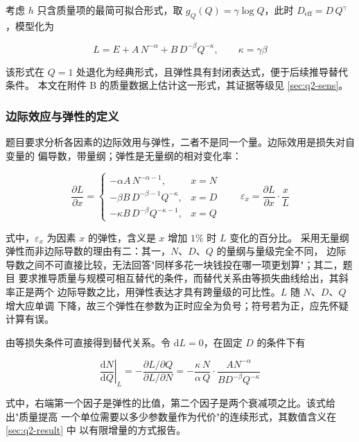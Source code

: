 \documentclass[bwprint]{gmcmthesis}
\numberwithin{equation}{section}
\numberwithin{figure}{section}
\numberwithin{table}{section}
\begin{document}
考虑 $h$ 只含质量项的最简可拟合形式，取 $g_Q(Q)=\gamma\log Q$，此时
$D_{\mathrm{eff}}=D\,Q^{\gamma}$，模型化为

\begin{equation}
L=E+A\,N^{-\alpha}+B\,D^{-\beta}Q^{-\kappa},\qquad \kappa=\gamma\beta
\end{equation}

该形式在 $Q=1$ 处退化为经典形式，且弹性具有封闭表达式，便于后续推导替代条件。
本文在附件 B 的质量数据上估计这一形式，其证据等级见 \ref{sec:q2-sens}。

\subsubsection{边际效应与弹性的定义}

题目要求分析各因素的边际效用与弹性，二者不是同一个量。边际效用是损失对自变量的
偏导数，带量纲；弹性是无量纲的相对变化率：

\begin{equation}
\frac{\partial L}{\partial x}
=\begin{cases}
-\alpha A\,N^{-\alpha-1}, & x=N\\[2pt]
-\beta B\,D^{-\beta-1}Q^{-\kappa}, & x=D\\[2pt]
-\kappa B\,D^{-\beta}Q^{-\kappa-1}, & x=Q
\end{cases}
\qquad
\varepsilon_x=\frac{\partial L}{\partial x}\cdot\frac{x}{L}
\end{equation}

式中，$\varepsilon_x$ 为因素 $x$ 的弹性，含义是 $x$ 增加 $1\%$ 时 $L$ 变化的百分比。
采用无量纲弹性而非边际导数的理由有二：其一，$N$、$D$、$Q$ 的量纲与量级完全不同，
边际导数之间不可直接比较，无法回答"同样多花一块钱投在哪一项更划算"；其二，题目
要求推导质量与规模可相互替代的条件，而替代关系由等损失曲线给出，其斜率正是两个
边际导数之比，用弹性表达才具有跨量级的可比性。$L$ 随 $N$、$D$、$Q$ 增大应单调
下降，故三个弹性在参数为正时应全为负号；符号若为正，应先怀疑计算有误。

由等损失条件可直接得到替代关系。令 $\mathrm{d}L=0$，在固定 $D$ 的条件下有

\begin{equation}
\left.\frac{\mathrm{d}N}{\mathrm{d}Q}\right|_{L}
=-\frac{\partial L/\partial Q}{\partial L/\partial N}
=-\frac{\kappa\,N}{\alpha\,Q}\cdot\frac{AN^{-\alpha}}{BD^{-\beta}Q^{-\kappa}}
\end{equation}

式中，右端第一个因子是弹性的比值，第二个因子是两个衰减项之比。该式给出"质量提高
一个单位需要以多少参数量作为代价"的连续形式，其数值含义在 \ref{sec:q2-result} 中
以有限增量的方式报告。
\end{document}
